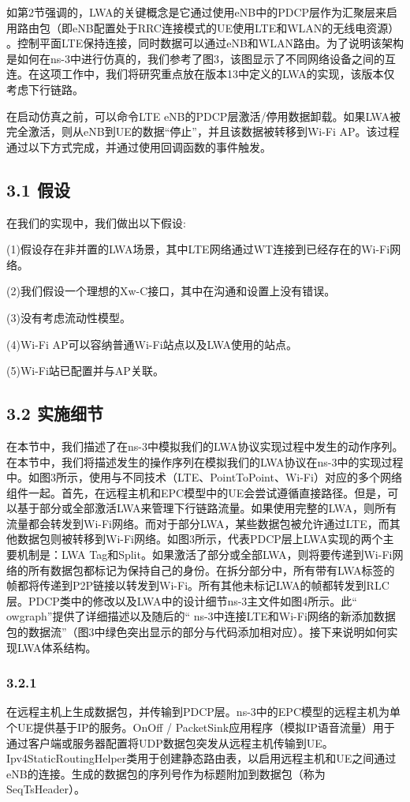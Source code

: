如第2节强调的，LWA的关键概念是它通过使用eNB中的PDCP层作为汇聚层来启用路由包（即eNB配置处于RRC连接模式的UE使用LTE和WLAN的无线电资源） 。控制平面LTE保持连接，同时数据可以通过eNB和WLAN路由。为了说明该架构是如何在ns-3中进行仿真的，我们参考了图3，该图显示了不同网络设备之间的互连。在这项工作中，我们将研究重点放在版本13中定义的LWA的实现，该版本仅考虑下行链路。

在启动仿真之前，可以命令LTE eNB的PDCP层激活/停用数据卸载。如果LWA被完全激活，则从eNB到UE的数据“停止”，并且该数据被转移到Wi-Fi AP。该过程通过以下方式完成，并通过使用回调函数的事件触发。

\subsection*{3.1 假设}
在我们的实现中，我们做出以下假设:

(1)假设存在非并置的LWA场景，其中LTE网络通过WT连接到已经存在的Wi-Fi网络。

(2)我们假设一个理想的Xw-C接口，其中在沟通和设置上没有错误。

(3)没有考虑流动性模型。

(4)Wi-Fi AP可以容纳普通Wi-Fi站点以及LWA使用的站点。

(5)Wi-Fi站已配置并与AP关联。

\subsection*{3.2 实施细节}
在本节中，我们描述了在ns-3中模拟我们的LWA协议实现过程中发生的动作序列。在本节中，我们将描述发生的操作序列在模拟我们的LWA协议在ns-3中的实现过程中。如图3所示，使用与不同技术（LTE、PointToPoint、Wi-Fi）对应的多个网络组件一起。首先，在远程主机和EPC模型中的UE会尝试遵循直接路径。但是，可以基于部分或全部激活LWA来管理下行链路流量。如果使用完整的LWA，则所有流量都会转发到Wi-Fi网络。而对于部分LWA，某些数据包被允许通过LTE，而其他数据包则被转移到Wi-Fi网络。如图3所示，代表PDCP层上LWA实现的两个主要机制是：LWA Tag和Split。如果激活了部分或全部LWA，则将要传递到Wi-Fi网络的所有数据包都标记为保持自己的身份。在拆分部分中，所有带有LWA标签的帧都将传递到P2P链接以转发到Wi-Fi。所有其他未标记LWA的帧都转发到RLC层。PDCP类中的修改以及LWA中的设计细节ns-3主文件如图4所示。此“ owgraph”提供了详细描述以及随后的“ ns-3中连接LTE和Wi-Fi网络的新添加数据包的数据流”（图3中绿色突出显示的部分与代码添加相对应）。接下来说明如何实现LWA体系结构。

\subsubsection*{3.2.1}
在远程主机上生成数据包，并传输到PDCP层。ns-3中的EPC模型的远程主机为单个UE提供基于IP的服务。OnOff / PacketSink应用程序（模拟IP语音流量）用于通过客户端或服务器配置将UDP数据包突发从远程主机传输到UE。Ipv4StaticRoutingHelper类用于创建静态路由表，以启用远程主机和UE之间通过eNB的连接。生成的数据包的序列号作为标题附加到数据包（称为SeqTsHeader）。

